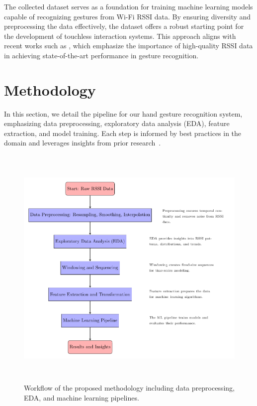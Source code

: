 \documentclass[10pt,twocolumn,letterpaper]{article}
\begin{document}
The collected dataset serves as a foundation for training machine learning models capable of recognizing gestures from Wi-Fi RSSI data. By ensuring diversity and preprocessing the data effectively, the dataset offers a robust starting point for the development of touchless interaction systems. This approach aligns with recent works such as \cite{haseeb2020wisture}, which emphasize the importance of high-quality RSSI data in achieving state-of-the-art performance in gesture recognition.








\section{Methodology}

In this section, we detail the pipeline for our hand gesture recognition system, emphasizing data preprocessing, exploratory data analysis (EDA), feature extraction, and model training. Each step is informed by best practices in the domain and leverages insights from prior research~\cite{haseeb2020wisture, abdelnasser2015wifi, wang2017wifi}.



\begin{figure}[t]
  \centering
 \includegraphics[width=\textwidth,height=12cm ]{workflow.pdf}
  \caption{Workflow of the proposed methodology including data preprocessing, EDA, and machine learning pipelines.}
  \label{fig:workflow_diagram}
\end{figure}
\end{document}
